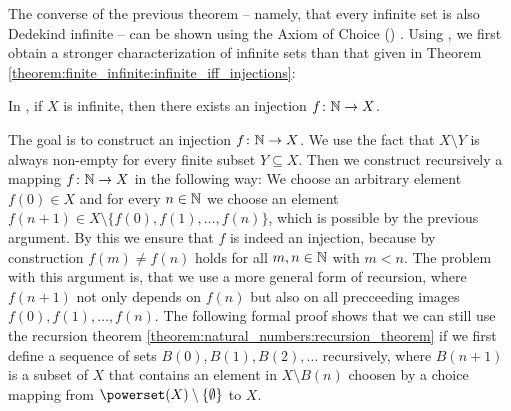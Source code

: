 The converse of the previous theorem -- namely, that every infinite set is also Dedekind infinite -- can be shown using the Axiom of Choice () . Using , we first obtain a stronger characterization of infinite sets than that given in Theorem \ref{theorem:finite_infinite:infinite_iff_injections}:

\begin{theorem}\label{theorem:finite_infinite:infinite_setn_injection}
    In , if $X$ is infinite, then there exists an injection $f\colon\mathbb{N}\to X$.
\end{theorem}

\begin{proofsketch}
    The goal is to construct an injection $f\colon\mathbb{N}\to X$. We use the fact that $X\setminus Y$ is always non-empty for every finite subset $Y\subseteq X$. Then we construct recursively a mapping $f\colon\mathbb{N}\to X$ in the following way: We choose an arbitrary element $f(0)\in X$ and for every $n\in\mathbb{N}$ we choose an element $f(n+1)\in X\setminus\{f(0),f(1),\ldots,f(n)\}$, which is possible by the previous argument. By this we ensure that $f$ is indeed an injection, because by construction $f(m)\neq f(n)$ holds for all $m,n\in\mathbb{N}$ with $m<n$. The problem with this argument is, that we use a more general form of recursion, where $f(n+1)$ not only depends on $f(n)$ but also on all precceeding images $f(0),f(1),\ldots,f(n)$. The following formal proof shows that we can still use the recursion theorem \ref{theorem:natural_numbers:recursion_theorem} if we first define a sequence of sets $B(0),B(1),B(2),\ldots$ recursively, where $B(n+1)$ is a subset of $X$ that contains an element in $X\setminus B(n)$ choosen by a choice mapping from $\powerset(X)\setminus\{\emptyset\}$ to $X$.
\end{proofsketch}

